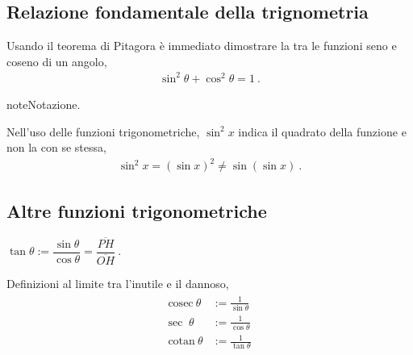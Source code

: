 \documentclass[letterpaper,10pt,italian]{jupyterBook}
\begin{document}
\subsection{Relazione fondamentale della trignometria}
\label{\detokenize{ch/trigonometry:relazione-fondamentale-della-trignometria}}
\sphinxAtStartPar
Usando il teorema di Pitagora è immediato dimostrare la  tra le funzioni seno e coseno di un angolo,
\begin{equation*}
\begin{split}\sin^2 \theta + \cos^2 \theta = 1 \ .\end{split}
\end{equation*}
\begin{sphinxadmonition}{note}{Notazione.}

\sphinxAtStartPar
Nell’uso delle funzioni trigonometriche, \(\sin^2 x\) indica il quadrato della funzione e non la {\hyperref[\detokenize{ch/precalculus/real-functions:math-hs-precalculus-real-functions-composite}]{}} con se stessa,
\begin{equation*}
\begin{split}\sin^2 x = (\sin x)^2 \neq \sin( \sin x) \ .\end{split}
\end{equation*}\end{sphinxadmonition}


\subsection{Altre funzioni trigonometriche}
\label{\detokenize{ch/trigonometry:altre-funzioni-trigonometriche}}
\sphinxAtStartPar
{} \(\tan \theta := \dfrac{\sin \theta}{\cos \theta} = \dfrac{\overline{PH}}{\overline{OH}} \ .\)

\sphinxAtStartPar
{} Definizioni al limite tra l’inutile e il dannoso,
\begin{equation*}
\begin{split}\begin{aligned}
  \text{cosec} \ \theta & := \frac{1}{\sin \theta} \\
  \text{sec  } \ \theta & := \frac{1}{\cos \theta} \\
  \text{cotan} \ \theta & := \frac{1}{\tan \theta} \\
\end{aligned}\end{split}
\end{equation*}
\end{document}

